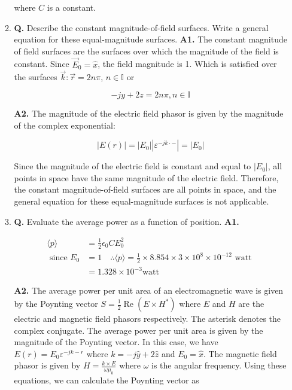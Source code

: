 \documentclass[main.tex]{subfiles}
\begin{document}
\begin{enumerate}
\begin{enumerate}
        where $C$ is a constant.
        
        \item \textbf{Q.} Describe the constant magnitude-of-field surfaces. Write a general equation for these equal-magnitude surfaces. \textbf{A1.} The constant magnitude of field surfaces are the surfaces over which the magnitude of the field is constant. Since $\vec{E}_0=\hat{x}$, the field magnitude is 1. Which is satisfied over the surfaces $\vec{k}: \vec{r}=2 n \pi$, $n \in \mathbb{I}$ or
        
        $$
        -j y+2 z=2 n \pi, n \in \mathbb{I}
        $$
        
        \textbf{A2.} The magnitude of the electric field phasor is given by the magnitude of the complex exponential:
        
        $$
        |E(r)|=\left|E_0\right|\left|\varepsilon^{-j k \cdot-}\right|=\left|E_0\right|
        $$
        
        Since the magnitude of the electric field is constant and equal to $\left|E_0\right|$, all points in space have the same magnitude of the electric field. Therefore, the constant magnitude-of-field surfaces are all points in space, and the general equation for these equal-magnitude surfaces is not applicable.
        
        \item \textbf{Q.} Evaluate the average power as a function of position. \textbf{A1.} 
        
        $$
        \begin{aligned}
        \langle p\rangle &= \frac{1}{2} \epsilon_0 C E_0^2 \\
        \text { since } E_0 &= 1 \quad \therefore\langle p\rangle=\frac{1}{2} \times 8.854 \times 3 \times 10^8 \times 10^{-12} \text { watt } \\
        & =1.328 \times 10^{-3} \mathrm{watt}
        \end{aligned}
        $$

        \textbf{A2.} The average power per unit area of an electromagnetic wave is given by the Poynting vector $S=\frac{1}{2} \operatorname{Re}\left(E \times H^*\right)$ where $E$ and $H$ are the electric and magnetic field phasors respectively. The asterisk denotes the complex conjugate. The average power per unit area is given by the magnitude of the Poynting vector. In this case, we have $E(r)=E_0 \varepsilon^{-j k-r}$ where $k=-j \hat{y}+2 \hat{z}$ and $E_0=\hat{x}$. The magnetic field phasor is given by $H=\frac{k \times E}{\omega \mu_0}$ where $\omega$ is the angular frequency. Using these equations, we can calculate the Poynting vector as
        

\end{enumerate}
\end{enumerate}
\end{document}
